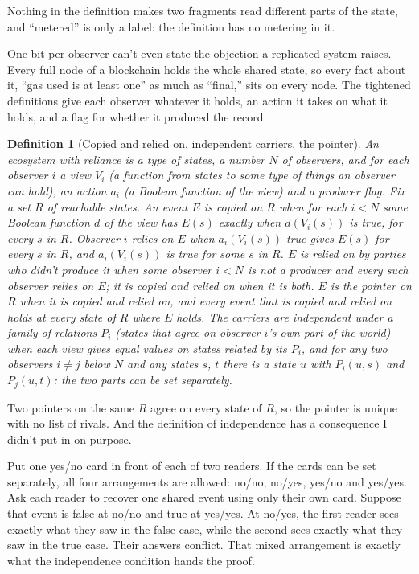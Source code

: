 \documentclass[11pt,twoside]{article}
\theoremstyle{thielethm}
\theoremstyle{thieledef}
\newtheorem{definition}{Definition}[section]
\theoremstyle{thieledef}
\theoremstyle{thieledef}
\theoremstyle{thielethm}
\theoremstyle{thieleobs}
\theoremstyle{thielethm}
\begin{document}
Nothing in the definition makes two fragments read different parts of the state, and
``metered'' is only a label: the definition has no metering in it.

One bit per observer can't even state the objection a replicated system raises. Every full
node of a blockchain holds the whole shared state, so every fact about it, ``gas used is at least
one'' as much as ``final,'' sits on every node. The tightened definitions give each observer
whatever it holds, an action it takes on what it holds, and a flag for whether it produced the
record.

\begin{definition}[Copied and relied on, independent carriers, the pointer]\label{def:u14-reliance}
An \emph{ecosystem with reliance} is a type of states, a number $N$ of observers, and for each
observer $i$ a view $V_i$ (a function from states to some type of things an observer can hold), an
action $a_i$ (a Boolean function of the view) and a producer flag. Fix a set $R$ of reachable
states. An event $E$ is \emph{copied} on $R$ when for each $i < N$ some Boolean function $d$ of the
view has $E(s)$ exactly when $d(V_i(s))$ is true, for every $s$ in $R$. Observer $i$ \emph{relies on}
$E$ when $a_i(V_i(s))$ true gives $E(s)$ for every $s$ in $R$, and $a_i(V_i(s))$ is true for some $s$ in
$R$. $E$ is \emph{relied on by parties who didn't produce it} when some observer $i < N$ is not a
producer and every such observer relies on $E$; it is \emph{copied and relied on} when it is both.
$E$ is the \emph{pointer} on $R$ when it is copied and relied on, and every event that is copied and
relied on holds at every state of $R$ where $E$ holds. The carriers are \emph{independent} under a family of relations $P_i$ (states that agree on
observer $i$'s own part of the world) when each view gives equal values on states related by its
$P_i$, and for any two observers $i \ne j$ below $N$ and any states $s$, $t$ there is a state $u$
with $P_i(u, s)$ and $P_j(u, t)$: the two parts can be set separately.
\end{definition}

Two pointers on the same $R$ agree on every state of $R$, so the pointer is unique with no list
of rivals. And the definition of independence has a consequence I
didn't put in on purpose.

Put one yes/no card in front of each of two readers. If the cards can be set
separately, all four arrangements are allowed: no/no, no/yes, yes/no and yes/yes.
Ask each reader to recover one shared event using only their own card. Suppose
that event is false at no/no and true at yes/yes. At no/yes, the first reader
sees exactly what they saw in the false case, while the second sees exactly
what they saw in the true case. Their answers conflict. That mixed arrangement
is exactly what the independence condition hands the proof.
\end{document}
